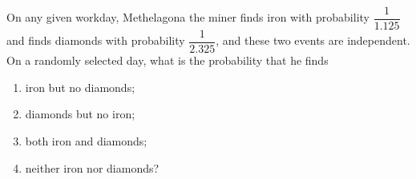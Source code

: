 On any given workday, Methelagona the miner finds iron with probability $\dfrac{1}{1.125}$ and finds diamonds with probability $\dfrac{1}{2.325}$, and these two events are independent. On a randomly selected day, what is the probability that he finds
\begin{enumerate}
\item[(a)] iron but no diamonds;
\item[(b)] diamonds but no iron;
\item[(c)] both iron and diamonds;
\item[(d)] neither iron nor diamonds?
\end{enumerate}
